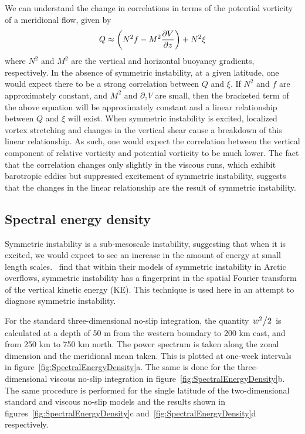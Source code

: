 We can understand the change in correlations in terms of the potential vorticity of a meridional flow, given by
\begin{equation}
    Q \approx \bigg(N^2 f - M^2 \pdv{V}{z} \bigg) + N^2 \xi
\end{equation}
where $N^2$ and $M^2$ are the vertical and horizontal buoyancy gradients, respectively. In the absence of symmetric instability, at a given latitude, one would expect there to be a strong correlation between $Q$ and $\xi$. If $N^2$ and $f$ are approximately constant, and $M^2$ and $\partial_z V$ are small, then the bracketed term of the above equation will be approximately constant and a linear relationship between $Q$ and $\xi$ will exist. When symmetric instability is excited, localized vortex stretching and changes in the vertical shear cause a breakdown of this linear relationship. As such, one would expect the correlation between the vertical component of relative vorticity and potential vorticity to be much lower. The fact that the correlation changes only slightly in the viscous runs, which exhibit barotropic eddies but suppressed excitement of symmetric instability, suggests that the changes in the linear relationship are the result of symmetric instability.

\subsection{Spectral energy density}
Symmetric instability is a sub-mesoscale instability, suggesting that when it is excited, we would expect to see an increase in the amount of energy at small length scales.~\citet{Yankovsky2019} find that within their models of symmetric instability in Arctic overflows, symmetric instability has a fingerprint in the spatial Fourier transform of the vertical kinetic energy (KE). This technique is used here in an attempt to diagnose symmetric instability.

For the standard three-dimensional no-slip integration, the quantity $\flatfrac{w^2}{2}$ is calculated at a depth of 50 m from the western boundary to 200 km east, and from 250 km to 750 km north. The power spectrum is taken along the zonal dimension and the meridional mean taken. This is plotted at one-week intervals in figure~\ref{fig:SpectralEnergyDensity}a. The same is done for the three-dimensional viscous no-slip integration in figure~\ref{fig:SpectralEnergyDensity}b. The same procedure is performed for the single latitude of the two-dimensional standard and viscous no-slip models and the results shown in figures~\ref{fig:SpectralEnergyDensity}c and~\ref{fig:SpectralEnergyDensity}d respectively.

